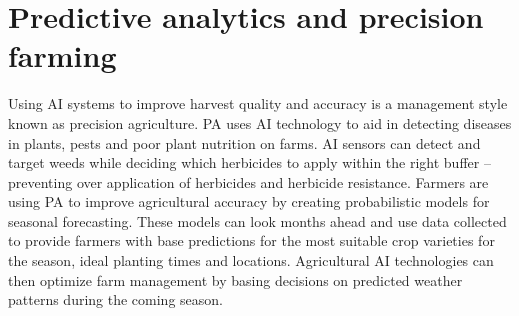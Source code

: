 \documentclass{article}
\begin{document}
\section{Predictive analytics and precision farming}
Using AI systems to improve harvest quality and accuracy is a management style known as precision agriculture. PA uses AI technology to aid in detecting diseases in plants, pests and poor plant nutrition on farms. AI sensors can detect and target weeds while deciding which herbicides to apply within the right buffer – preventing over application of herbicides and herbicide resistance.
Farmers are using PA to improve agricultural accuracy by creating probabilistic models for seasonal forecasting. These models can look months ahead and use data collected to provide farmers with base predictions for the most suitable crop varieties for the season, ideal planting times and locations. Agricultural AI technologies can then optimize farm management by basing decisions on predicted weather patterns during the coming season.
\end{document}
